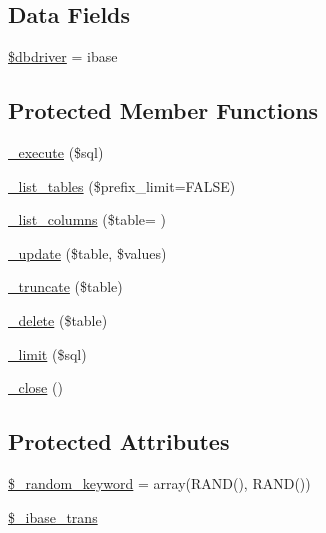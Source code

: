 \subsection*{Data Fields}
\begin{DoxyCompactItemize}
\item 
\hyperlink{class_c_i___d_b__ibase__driver_a0cde2a16322a023d040aa7f725877597}{\$dbdriver} = \textquotesingle{}ibase\textquotesingle{}
\end{DoxyCompactItemize}
\subsection*{Protected Member Functions}
\begin{DoxyCompactItemize}
\item 
\hyperlink{class_c_i___d_b__ibase__driver_a114ab675d89bf8324a41785fb475e86d}{\+\_\+execute} (\$sql)
\item 
\hyperlink{class_c_i___d_b__ibase__driver_a435c0f3ce54fe7daa178baa8532ebd54}{\+\_\+list\+\_\+tables} (\$prefix\+\_\+limit=F\+A\+L\+S\+E)
\item 
\hyperlink{class_c_i___d_b__ibase__driver_a2a81bb476a5c76fe6f763b0557c1e4c2}{\+\_\+list\+\_\+columns} (\$table= \textquotesingle{}\textquotesingle{})
\item 
\hyperlink{class_c_i___d_b__ibase__driver_a2540b03a93fa73ae74c10d0e16fc073e}{\+\_\+update} (\$table, \$values)
\item 
\hyperlink{class_c_i___d_b__ibase__driver_aa029600528fc1ce660a23ff4b4667f95}{\+\_\+truncate} (\$table)
\item 
\hyperlink{class_c_i___d_b__ibase__driver_a133ea8446ded52589bd22cc9163d0896}{\+\_\+delete} (\$table)
\item 
\hyperlink{class_c_i___d_b__ibase__driver_a3a02ea06541b8ecc25a33a61651562c8}{\+\_\+limit} (\$sql)
\item 
\hyperlink{class_c_i___d_b__ibase__driver_a4d9082658000e5ede8312067c6dda9db}{\+\_\+close} ()
\end{DoxyCompactItemize}
\subsection*{Protected Attributes}
\begin{DoxyCompactItemize}
\item 
\hyperlink{class_c_i___d_b__ibase__driver_a10213aa6e05f6d924d3277bb1d2fea00}{\$\+\_\+random\+\_\+keyword} = array(\textquotesingle{}R\+A\+N\+D()\textquotesingle{}, \textquotesingle{}R\+A\+N\+D()\textquotesingle{})
\item 
\hyperlink{class_c_i___d_b__ibase__driver_a515e622846336e361f281a522c025059}{\$\+\_\+ibase\+\_\+trans}
\end{DoxyCompactItemize}


